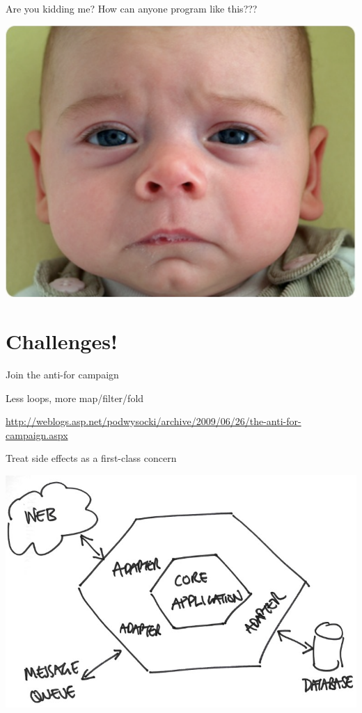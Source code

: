 \documentclass[mathserif]{beamer}
\begin{document}
\begin{frame}{Are you kidding me?}
  How can anyone program like this???
  \begin{center}
    \includegraphics[scale=0.3]{img/sadbaby.png}
  \end{center}
\end{frame}

\section{Challenges!}

\begin{frame}{Join the anti-for campaign}

  \begin{center}
    {\Huge Less loops, more map/filter/fold}
  \end{center}
  \vskip5mm
  \url{http://weblogs.asp.net/podwysocki/archive/2009/06/26/the-anti-for-campaign.aspx}
  
\end{frame}

\begin{frame}{Treat side effects as a first-class concern}

  \begin{center}
    \includegraphics[scale=0.3]{img/hexagonal_architecture_sketch.jpg}
  \end{center}

\end{frame}
\end{document}
